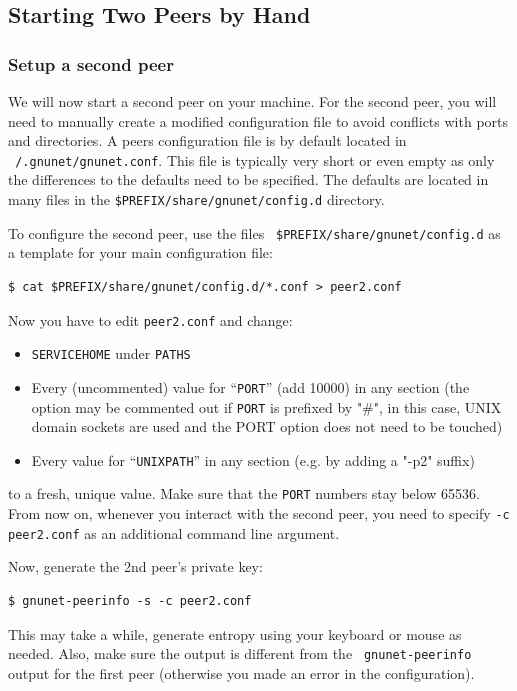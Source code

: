 \documentclass[10pt]{article}
\begin{document}
\subsection{Starting Two Peers by Hand}
\subsubsection{Setup a second peer}
We will now start a second peer on your machine.
For the second peer, you will need to manually create a modified
configuration file to avoid conflicts with ports and directories.
A peers configuration file is by default located in {\tt ~/.gnunet/gnunet.conf}.
This file is typically very short or even empty as only the differences to the
defaults need to be specified.  The defaults are located in
many files in the {\tt \$PREFIX/share/gnunet/config.d} directory.

To configure the second peer, use the files {\tt
  \$PREFIX/share/gnunet/config.d} as a template for your main
configuration file:
%
\lstset{language=bash}
\begin{lstlisting}
$ cat $PREFIX/share/gnunet/config.d/*.conf > peer2.conf
\end{lstlisting}
Now you have to edit {\tt peer2.conf} and change:
\begin{itemize}
  \itemsep0em
  \item{\texttt{SERVICEHOME} under \texttt{PATHS}}
  \item{Every (uncommented) value for ``\texttt{PORT}'' (add 10000) in any
        section (the option may be commented out if \texttt{PORT} is
        prefixed by "\#", in this case, UNIX domain sockets are used
        and the PORT option does not need to be touched) }
  \item{Every value for ``\texttt{UNIXPATH}'' in any section (e.g. by adding a "-p2" suffix)}
\end{itemize}
to a fresh, unique value.  Make sure that the \texttt{PORT} numbers stay
below 65536.  From now on, whenever you interact with the second
peer, you need to specify {\tt -c peer2.conf} as an additional
command line argument.

Now, generate the 2nd peer's private key:

\lstset{language=bash}
\begin{lstlisting}
$ gnunet-peerinfo -s -c peer2.conf
\end{lstlisting}

This may take a while, generate entropy using your keyboard or mouse
as needed.  Also, make sure the output is different from the {\tt
  gnunet-peerinfo} output for the first peer (otherwise you made an
error in the configuration).
\end{document}
